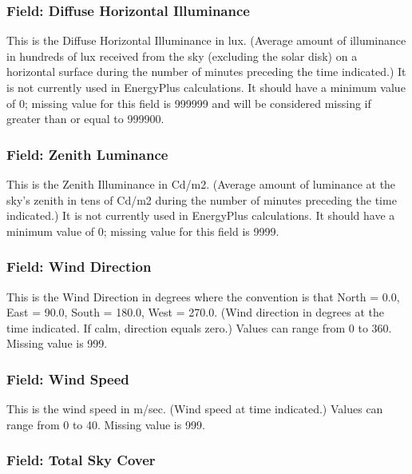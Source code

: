 \subsubsection{Field: Diffuse Horizontal Illuminance}\label{field-diffuse-horizontal-illuminance}

This is the Diffuse Horizontal Illuminance in lux. (Average amount of illuminance in hundreds of lux received from the sky (excluding the solar disk) on a horizontal surface during the number of minutes preceding the time indicated.) It is not currently used in EnergyPlus calculations. It should have a minimum value of 0; missing value for this field is 999999 and will be considered missing if greater than or equal to 999900.

\subsubsection{Field: Zenith Luminance}\label{field-zenith-luminance}

This is the Zenith Illuminance in Cd/m2. (Average amount of luminance at the sky's zenith in tens of Cd/m2 during the number of minutes preceding the time indicated.) It is not currently used in EnergyPlus calculations. It should have a minimum value of 0; missing value for this field is 9999.

\subsubsection{Field: Wind Direction}\label{field-wind-direction}

This is the Wind Direction in degrees where the convention is that North = 0.0, East = 90.0, South = 180.0, West = 270.0. (Wind direction in degrees at the time indicated. If calm, direction equals zero.) Values can range from 0 to 360. Missing value is 999.

\subsubsection{Field: Wind Speed}\label{field-wind-speed}

This is the wind speed in m/sec. (Wind speed at time indicated.) Values can range from 0 to 40. Missing value is 999.

\subsubsection{Field: Total Sky Cover}\label{field-total-sky-cover}

